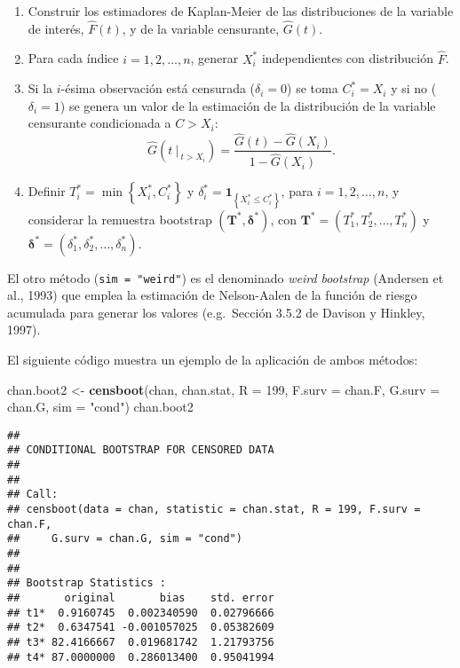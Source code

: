 \documentclass[]{book}
\newenvironment{Shaded}{\begin{snugshade}}{\end{snugshade}}
\newcommand{\KeywordTok}[1]{\textcolor[rgb]{0.13,0.29,0.53}{\textbf{#1}}}
\newcommand{\DataTypeTok}[1]{\textcolor[rgb]{0.13,0.29,0.53}{#1}}
\newcommand{\DecValTok}[1]{\textcolor[rgb]{0.00,0.00,0.81}{#1}}
\newcommand{\StringTok}[1]{\textcolor[rgb]{0.31,0.60,0.02}{#1}}
\newcommand{\NormalTok}[1]{#1}
\theoremstyle{break}
\theoremstyle{definition}
\theoremstyle{definition}
\theoremstyle{definition}
\theoremstyle{remark}
\begin{document}
\begin{enumerate}
\def\labelenumi{\arabic{enumi}.}
\item
  Construir los estimadores de Kaplan-Meier de las distribuciones de la
  variable de interés, \(\hat{F}\left( t \right)\), y de la variable
  censurante, \(\hat{G}\left( t \right)\).
\item
  Para cada índice \(i=1,2,\ldots ,n\), generar \(X_i^{\ast}\)
  independientes con distribución \(\hat{F}\).
\item
  Si la \(i\)-ésima observación está censurada (\(\delta_i=0\)) se toma
  \(C_i^{\ast}=X_i\) y si no (\(\delta_i=1\)) se genera un valor de la
  estimación de la distribución de la variable censurante condicionada a
  \(C > X_i\):
  \[\hat G \left(\left. t \ \right\vert_{\ t > X_i} \right) 
  = \frac{\hat G(t) - \hat G(X_i)}{1- \hat G(X_i)}.\]
\item
  Definir \(T_i^{\ast}=\min \left\{ X_i^{\ast},C_i^{\ast}\right\}\) y
  \(\delta_i^{\ast}=\mathbf{1}_{\left\{ X_i^{\ast}\leq C_i^{\ast}\right\}}\),
  para \(i = 1, 2, \ldots, n\), y considerar la remuestra bootstrap
  \(\left( \mathbf{T}^{\ast},\boldsymbol{\delta}^{\ast}\right)\), con
  \(\mathbf{T}^{\ast}=\left( T_1^{\ast},T_2^{\ast}, \ldots, T_n^{\ast} \right)\)
  y
  \(\boldsymbol{\delta}^{\ast} = \left( \delta_1^{\ast}, \delta_2^{\ast},\ldots ,\delta_n^{\ast} \right)\).
\end{enumerate}

El otro método (\texttt{sim\ =\ "weird"}) es el denominado \emph{weird
bootstrap} (Andersen et al., 1993) que emplea la estimación de
Nelson-Aalen de la función de riesgo acumulada para generar los valores
(e.g.~Sección 3.5.2 de Davison y Hinkley, 1997).

El siguiente código muestra un ejemplo de la aplicación de ambos
métodos:

\begin{Shaded}
\begin{Highlighting}[]
\NormalTok{chan.boot2 <-}\StringTok{ }\KeywordTok{censboot}\NormalTok{(chan, chan.stat, }\DataTypeTok{R =} \DecValTok{199}\NormalTok{, }\DataTypeTok{F.surv =}\NormalTok{ chan.F, }
                  \DataTypeTok{G.surv =}\NormalTok{ chan.G, }\DataTypeTok{sim =} \StringTok{"cond"}\NormalTok{)}
\NormalTok{chan.boot2}
\end{Highlighting}
\end{Shaded}

\begin{verbatim}
## 
## CONDITIONAL BOOTSTRAP FOR CENSORED DATA
## 
## 
## Call:
## censboot(data = chan, statistic = chan.stat, R = 199, F.surv = chan.F, 
##     G.surv = chan.G, sim = "cond")
## 
## 
## Bootstrap Statistics :
##       original       bias    std. error
## t1*  0.9160745  0.002340590  0.02796666
## t2*  0.6347541 -0.001057025  0.05382609
## t3* 82.4166667  0.019681742  1.21793756
## t4* 87.0000000  0.286013400  0.95041994
\end{verbatim}
\end{document}
